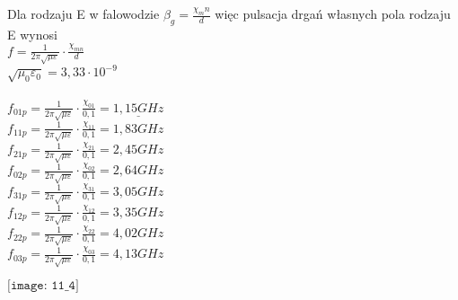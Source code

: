 \begin{solution}
\begin{enumerate}[a)]
Dla rodzaju E w falowodzie $\beta_g = \frac{\chi_mn}{d}$ więc pulsacja drgań własnych pola rodzaju E wynosi \\
$f = \frac{1}{2\pi\sqrt{\mu \varepsilon}} \cdot \frac{\chi_{mn}}{d}$\\
$\sqrt{\mu_0 \varepsilon_0}=3,33 \cdot 10^{-9}$ \\
\\
$f_{01p} = \frac{1}{2\pi\sqrt{\mu \varepsilon}} \cdot \frac{\chi_{01}}{0,1} = \underline{1,15 GHz}$\\
$f_{11p} = \frac{1}{2\pi\sqrt{\mu \varepsilon}} \cdot \frac{\chi_{11}}{0,1} = 1,83 GHz$\\
$f_{21p} = \frac{1}{2\pi\sqrt{\mu \varepsilon}} \cdot \frac{\chi_{21}}{0,1} = 2,45 GHz$\\
$f_{02p} = \frac{1}{2\pi\sqrt{\mu \varepsilon}} \cdot \frac{\chi_{02}}{0,1} = 2,64 GHz$\\
$f_{31p} = \frac{1}{2\pi\sqrt{\mu \varepsilon}} \cdot \frac{\chi_{31}}{0,1} = 3,05 GHz$\\
$f_{12p} = \frac{1}{2\pi\sqrt{\mu \varepsilon}} \cdot \frac{\chi_{12}}{0,1} = 3,35 GHz$\\
$f_{22p} = \frac{1}{2\pi\sqrt{\mu \varepsilon}} \cdot \frac{\chi_{22}}{0,1} = 4,02 GHz$\\
$f_{03p} = \frac{1}{2\pi\sqrt{\mu \varepsilon}} \cdot \frac{\chi_{03}}{0,1} = 4,13 GHz$\\

    \begin{center}
        $\texttt{[image: 11\_4]}$\\
    \end{center}
    \end{enumerate}
\end{solution}